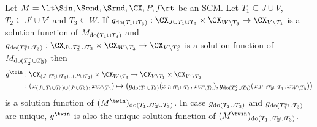 \begin{Lem}\label{lem:sol_fns_intervened_twin_scm}
Let $M = \lt \Sin, \Send, \Srnd, \CX, P, f \rt$ be an SCM.
Let $T_1 \subseteq J \cup V$, $T_2 \subseteq J' \cup V'$ and $T_3 \subseteq W$. 
If $g_{\doit(T_1\cup T_3)} : \CX_{J \cup T_1 \cup T_3} \times \CX_{W \setminus T_3} \to \CX_{V \setminus T_1}$ is a solution function of $M_{\operatorname{do}(T_1\cup T_3)}$ 
and $g_{\doit(T_2^\circ\cup T_3)} : \CX_{J \cup T_2^\circ \cup T_3} \times \CX_{W \setminus T_3} \to \CX_{V \setminus T_2^\circ}$ is a solution function of $M_{\operatorname{do}(T_2^\circ \cup T_3)}$ 
then
  \begin{equation*}\begin{split}
    g^\twin & : \CX_{(J \cup T_1 \cup T_3) \cup (J' \cup T_2)} \times \CX_{W \setminus T_3} \to \CX_{V \setminus T_1} \times \CX_{V' \setminus T_2} \\
    & : (x_{(J \cup T_1 \cup T_3) \cup (J' \cup T_2)}, x_{W \setminus T_3}) \mapsto \big(g_{\doit(T_1\cup T_3)}(x_{J \cup T_1 \cup T_3},x_{W\setminus T_3}),g_{\doit(T_2^\circ\cup T_3)}(x_{J' \cup T_2 \cup T_3},x_{W \setminus T_3})\big) 
  \end{split}\end{equation*}
is a solution function of $(M^{\twin})_{\doit(T_1 \cup T_2 \cup T_3)}$.
  In case $g_{\operatorname{do}(T_1\cup T_3)}$ and $g_{\operatorname{do}(T_2^\circ \cup T_3)}$ are unique, $g^\twin$ is also the
  unique solution function of $(M^{\twin})_{\doit(T_1 \cup T_2 \cup T_3)}$.
\end{Lem}

